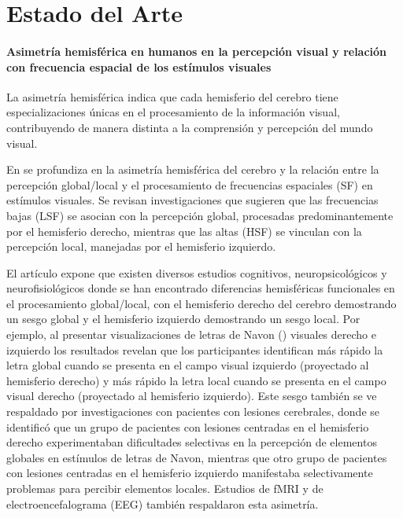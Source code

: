 \chapter{Estado del Arte}\label{chapter:state-of-the-art}

\subsubsection{Asimetr\'ia hemisf\'erica en humanos en la percepci\'on visual y relaci\'on con frecuencia espacial de los est\'imulos visuales}

La asimetría hemisf\'erica indica que cada hemisferio del cerebro tiene especializaciones únicas en el procesamiento de la información visual, contribuyendo de manera distinta a la comprensión y percepción del mundo visual.

En \cite{flevaris_spatial_2016} se profundiza en la asimetría hemisférica del cerebro y la relación entre la percepción global/local y el procesamiento de frecuencias espaciales (SF) en estímulos visuales. Se revisan investigaciones que sugieren que las frecuencias bajas (LSF) se asocian con la percepción global, procesadas predominantemente por el hemisferio derecho, mientras que las altas (HSF) se vinculan con la percepción local, manejadas por el hemisferio izquierdo. 

El art\'iculo expone que existen diversos estudios cognitivos, neuropsicológicos y neurofisiológicos donde se han encontrado diferencias hemisféricas funcionales en el procesamiento global/local, con el hemisferio derecho del cerebro demostrando un sesgo global y el hemisferio izquierdo demostrando un sesgo local. Por ejemplo, al presentar visualizaciones de letras de Navon (\cite{navon_forest_1977}) visuales derecho e izquierdo los resultados revelan que los participantes identifican más rápido la letra global cuando se presenta en el campo visual izquierdo (proyectado al hemisferio derecho) y más rápido la letra local cuando se presenta en el campo visual derecho (proyectado al hemisferio izquierdo). Este sesgo también se ve respaldado por investigaciones con pacientes con lesiones cerebrales, donde se identificó que un grupo de pacientes con lesiones centradas en el hemisferio derecho experimentaban dificultades selectivas en la percepción de elementos globales en estímulos de letras de Navon, mientras que otro grupo de pacientes con lesiones centradas en el hemisferio izquierdo manifestaba selectivamente problemas para percibir elementos locales. Estudios de fMRI  y de electroencefalograma (EEG) también respaldaron esta asimetría.

